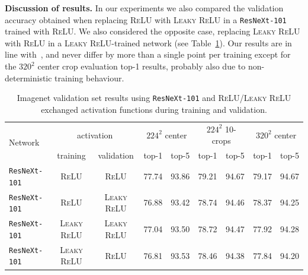 \documentclass[10pt,twocolumn,letterpaper]{article}
\newcommand{\myparagraph}[1]{\vspace{5pt}\noindent\textbf{#1}}
\begin{document}
\myparagraph{Discussion of results.}
In our experiments we also compared the validation accuracy obtained when replacing \textsc{ReLU} with \textsc{Leaky ReLU} in a \texttt{ResNeXt-101} trained with \textsc{ReLU}. We also considered the opposite case, replacing \textsc{Leaky ReLU} with \textsc{ReLU} in a \textsc{Leaky ReLU}-trained network (see Table~\ref{tab:imagenetReluLRelu}). Our results are in line with~\cite{Xu+15}, and never differ by more than a single point per training except for the $320^2$ center crop evaluation top-1 results, probably also due to non-deterministic training behaviour.

\begin{table}[t]
\centering
\small
\begin{tabular}{lcccccccc}
  \toprule
    \multirow{2}{*}{Network} & \multicolumn{2}{c}{activation} & \multicolumn{2}{c}{$224^2$ center} & \multicolumn{2}{c}{$224^2$ 10-crops} & \multicolumn{2}{c}{$320^2$ center} \\
  \cmidrule{4-9}
    & training & validation & top-1 & top-5 & top-1 & top-5 & top-1 & top-5 \\
  \midrule
    \texttt{ResNeXt-101} & \textsc{ReLU} & \textsc{ReLU} & 77.74 & 93.86 & 79.21 & 94.67 & 79.17 & 94.67 \\
    \texttt{ResNeXt-101} & \textsc{ReLU} & \textsc{Leaky ReLU} & 76.88 & 93.42 & 78.74 & 94.46 & 78.37 & 94.25 \\
  \midrule
    \texttt{ResNeXt-101} & \textsc{Leaky ReLU} & \textsc{Leaky ReLU} & 77.04 & 93.50 & 78.72 & 94.47 & 77.92 & 94.28 \\
    \texttt{ResNeXt-101} & \textsc{Leaky ReLU} & \textsc{ReLU} & 76.81 & 93.53 & 78.46 & 94.38 & 77.84 & 94.20 \\
  \bottomrule
\end{tabular}
  \vspace{1em}
  \caption{Imagenet validation set results using \texttt{ResNeXt-101} and \textsc{ReLU}/\textsc{Leaky ReLU} exchanged activation functions during training and validation.}
  \label{tab:imagenetReluLRelu}
\end{table}
\end{document}
